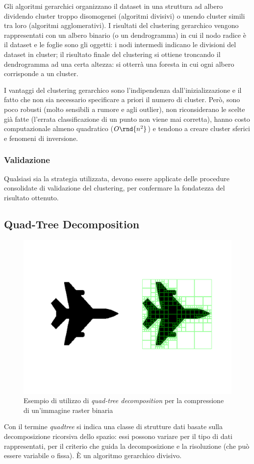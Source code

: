 \documentclass[\main/main.tex]{subfiles}
\begin{document}
Gli algoritmi gerarchici organizzano il dataset in una struttura ad albero dividendo cluster troppo disomogenei (algoritmi divisivi) o unendo cluster simili tra loro (algoritmi agglomerativi). I risultati del clustering gerarchico vengono rappresentati con un albero binario (o un dendrogramma) in cui il nodo radice è il dataset e le foglie sono gli oggetti: i nodi intermedi indicano le divisioni del dataset in cluster; il risultato finale del clustering si ottiene troncando il dendrogramma ad una certa altezza: si otterrà una foresta in cui ogni albero corrisponde a un cluster.

I vantaggi del clustering gerarchico sono l'indipendenza dall'inizializzazione e il fatto che non sia necessario specificare a priori il numero di cluster. Però, sono poco robusti (molto sensibili a rumore e agli outlier), non riconsiderano le scelte già fatte (l'errata classificazione di un punto non viene mai corretta), hanno costo computazionale almeno quadratico ($O\rnd{n^2}$) e tendono a creare cluster sferici e fenomeni di inversione.

\subsubsection{Validazione}
Qualsiasi sia la strategia utilizzata, devono essere applicate delle procedure consolidate di validazione del clustering, per confermare la fondatezza del risultato ottenuto.

\subsection{Quad-Tree Decomposition}
\begin{figure} \centering
	\caption{Esempio di utilizzo di \textit{quad-tree decomposition} per la compressione di un'immagine raster binaria}
	\label{fig:qtdecomp}

	\includegraphics[width=\textwidth,trim={1.25in 2.5in 1.25in 2.5in},clip]{../images/qtdecomp.pdf}
\end{figure}
Con il termine \textit{quadtree} si indica una classe di strutture dati basate sulla decomposizione ricorsiva dello spazio: essi possono variare per il tipo di dati rappresentati, per il criterio che guida la decomposizione e la risoluzione (che può essere variabile o fissa). È un algoritmo gerarchico divisivo.
\end{document}
